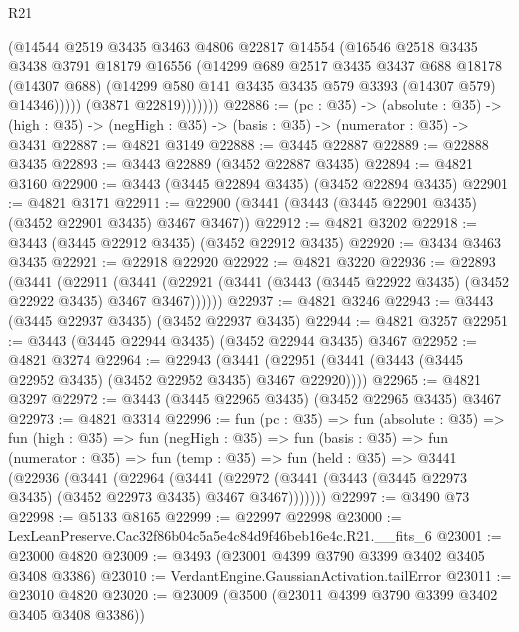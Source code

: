 \begin{lexlean}{R21}
\begin{coremodule}
                  (@14544
                    @2519
                    @3435
                    @3463
                    @4806
                    @22817
                    @14554
                    (@16546
                      @2518
                      @3435
                      @3438
                      @3791
                      @18179
                      @16556
                      (@14299
                        @689
                        @2517
                        @3435
                        @3437
                        @688
                        @18178
                        (@14307 @688)
                        (@14299 @580 @141 @3435 @3435 @579 @3393 (@14307 @579) @14346)))))
                (@3871 @22819)))))))
@22886 := (pc : @35) ->
  (absolute : @35) -> (high : @35) -> (negHigh : @35) -> (basis : @35) -> (numerator : @35) -> @3431
@22887 := @4821 @3149
@22888 := @3445 @22887
@22889 := @22888 @3435
@22893 := @3443 @22889 (@3452 @22887 @3435)
@22894 := @4821 @3160
@22900 := @3443 (@3445 @22894 @3435) (@3452 @22894 @3435)
@22901 := @4821 @3171
@22911 := @22900 (@3441 (@3443 (@3445 @22901 @3435) (@3452 @22901 @3435) @3467 @3467))
@22912 := @4821 @3202
@22918 := @3443 (@3445 @22912 @3435) (@3452 @22912 @3435)
@22920 := @3434 @3463 @3435
@22921 := @22918 @22920
@22922 := @4821 @3220
@22936 := @22893
    (@3441
      (@22911
        (@3441 (@22921 (@3441 (@3443 (@3445 @22922 @3435) (@3452 @22922 @3435) @3467 @3467))))))
@22937 := @4821 @3246
@22943 := @3443 (@3445 @22937 @3435) (@3452 @22937 @3435)
@22944 := @4821 @3257
@22951 := @3443 (@3445 @22944 @3435) (@3452 @22944 @3435) @3467
@22952 := @4821 @3274
@22964 := @22943
    (@3441 (@22951 (@3441 (@3443 (@3445 @22952 @3435) (@3452 @22952 @3435) @3467 @22920))))
@22965 := @4821 @3297
@22972 := @3443 (@3445 @22965 @3435) (@3452 @22965 @3435) @3467
@22973 := @4821 @3314
@22996 := fun (pc : @35) =>
  fun (absolute : @35) =>
  fun (high : @35) =>
  fun (negHigh : @35) =>
  fun (basis : @35) =>
  fun (numerator : @35) =>
  fun (temp : @35) =>
  fun (held : @35) =>
  @3441
    (@22936
      (@3441
        (@22964
          (@3441 (@22972 (@3441 (@3443 (@3445 @22973 @3435) (@3452 @22973 @3435) @3467 @3467)))))))
@22997 := @3490 @73
@22998 := @5133 @8165
@22999 := @22997 @22998
@23000 := LexLeanPreserve.Cac32f86b04c5a5e4c84d9f46beb16e4c.R21.__fits_6
@23001 := @23000 @4820
@23009 := @3493 (@23001 @4399 @3790 @3399 @3402 @3405 @3408 @3386)
@23010 := VerdantEngine.GaussianActivation.tailError
@23011 := @23010 @4820
@23020 := @23009 (@3500 (@23011 @4399 @3790 @3399 @3402 @3405 @3408 @3386))

\end{coremodule}
\end{lexlean}
